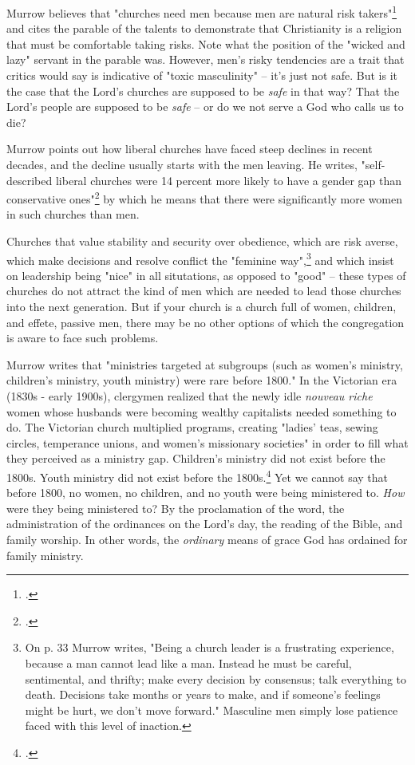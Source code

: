 Murrow believes that "churches need men because men are natural risk takers"\footcite[p. 25]{murrowmen} and cites the parable of the talents to demonstrate that Christianity is a religion that must be comfortable taking risks.  Note what the position of the "wicked and lazy" servant in the parable was.  However, men's risky tendencies are a trait that critics would say is indicative of "toxic masculinity" -- it's just not safe.  But is it the case that the Lord's churches are supposed to be \textit{safe} in that way?  That the Lord's people are supposed to be \textit{safe} -- or do we not serve a God who calls us to die?

Murrow points out how liberal churches have faced steep declines in recent decades, and the decline usually starts with the men leaving.  He writes, "self-described liberal churches were 14 percent more likely to have a gender gap than conservative ones"\footcite[p. 25]{murrowmen} by which he means that there were significantly more women in such churches than men.

Churches that value stability and security over obedience, which are risk averse, which make decisions and resolve conflict the "feminine way",\footnote{On p. 33 Murrow writes, "Being a church leader is a frustrating experience, because a man cannot lead like a man.  Instead he must be careful, sentimental, and thrifty; make every decision by consensus; talk everything to death.  Decisions take months or years to make, and if someone's feelings might be hurt, we don't move forward."  Masculine men simply lose patience faced with this level of inaction.} and which insist on leadership being "nice" in all situtations, as opposed to "good" -- these types of churches do not attract the kind of men which are needed to lead those churches into the next generation.  But if your church is a church full of women, children, and effete, passive men, there may be no other options of which the congregation is aware to face such problems.  

Murrow writes that "ministries targeted at subgroups (such as women's ministry, children's ministry, youth ministry) were rare before 1800." In the Victorian era (1830s - early 1900s), clergymen realized that the newly idle \textit{nouveau riche} women whose husbands were becoming wealthy capitalists needed something to do.  The Victorian church multiplied programs, creating "ladies' teas, sewing circles, temperance unions, and women's missionary societies" in order to fill what they perceived as a ministry gap.  Children's ministry did not exist before the 1800s.  Youth ministry did not exist before the 1800s.\footcite[p. 59]{murrowmen}  Yet we cannot say that before 1800, no women, no children, and no youth were being ministered to.  \textit{How} were they being ministered to?  By the proclamation of the word, the administration of the ordinances on the Lord's day, the reading of the Bible, and family worship.  In other words, the \textit{ordinary} means of grace God has ordained for family ministry.

